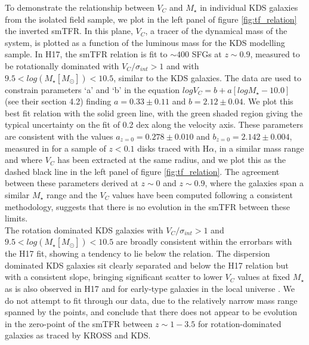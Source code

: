 \documentclass[fleqn,usenatbib]{mn2e}
\begin{document}
To demonstrate the relationship between $V_{C}$ and $M_{\star}$ in individual KDS galaxies from the isolated field sample, we plot in the left panel of figure \ref{fig:tf_relation} the inverted smTFR.
In this plane, $V_{C}$, a tracer of the dynamical mass of the system, is plotted as a function of the luminous mass for the KDS modelling sample.
In H17, the smTFR relation is fit to $\sim400$ SFGs at $z\sim0.9$, measured to be rotationally dominated with $V_{C}/\sigma_{int} > 1$ and with $9.5 < log(M_{\star}[M_{\odot}]) < 10.5$, similar to the KDS galaxies.
The data are used to constrain parameters `a' and `b' in the equation $logV_{C}=b+a[logM_{\star} - 10.0]$ (see their section 4.2) finding $a = 0.33 \pm 0.11$ and $b = 2.12 \pm 0.04$.
We plot this best fit relation with the solid green line, with the green shaded region giving the typical uncertainty on the fit of 0.2 dex along the velocity axis.
These parameters are consistent with the values $a_{z=0} = 0.278 \pm 0.010$ and $b_{z=0} = 2.142 \pm 0.004$, measured in \cite{Reyes2011} for a sample of $z<0.1$ disks traced with H$\alpha$, in a similar mass range and where $V_{C}$ has been extracted at the same radius, and we plot this as the dashed black line in the left panel of figure \ref{fig:tf_relation}.
The agreement between these parameters derived at $z\sim0$ and $z\sim0.9$, where the galaxies span a similar $M_{\star}$ range and the $V_{C}$ values have been computed following a consistent methodology, suggests that there is no evolution in the smTFR between these limits. \\

The rotation dominated KDS galaxies with $V_{C}/\sigma_{int} > 1$ and $9.5 < log(M_{\star}[M_{\odot}]) < 10.5$ are broadly consistent within the errorbars with the H17 fit, showing a tendency to lie below the relation.
The dispersion dominated KDS galaxies sit clearly separated and below the H17 relation but with a consistent slope, bringing significant scatter to lower $V_{C}$ values at fixed $M_{\star}$ as is also observed in H17 and for early-type galaxies in the local universe \citep[e.g.][]{Romanowsky2012}.  
We do not attempt to fit through our data, due to the relatively narrow mass range spanned by the points, and conclude that there does not appear to be evolution in the zero-point of the smTFR between $z\sim1-3.5$ for rotation-dominated galaxies as traced by KROSS and KDS. \\
\end{document}

